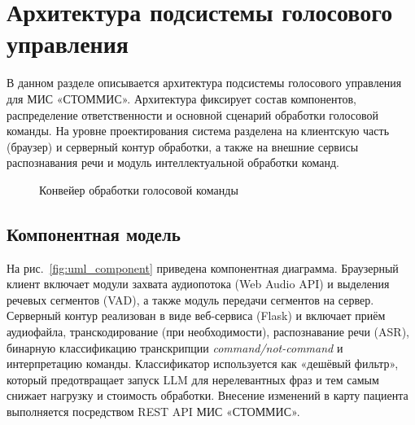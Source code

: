 
\clearpage
\section{Архитектура подсистемы голосового управления}
\label{sec:architecture}

В данном разделе описывается архитектура подсистемы голосового управления для МИС «СТОММИС».
Архитектура фиксирует состав компонентов, распределение ответственности и основной сценарий обработки голосовой команды.
На уровне проектирования система разделена на клиентскую часть (браузер) и серверный контур обработки, а также на внешние сервисы распознавания речи и модуль интеллектуальной обработки команд.

\begin{figure}[t]
    \centering
    \caption{Конвейер обработки голосовой команды}
    \label{fig:pipeline}
\end{figure}

\subsection{Компонентная модель}

На рис.~\ref{fig:uml_component} приведена компонентная диаграмма.
Браузерный клиент включает модули захвата аудиопотока (Web Audio API) и выделения речевых сегментов (VAD), а также модуль передачи сегментов на сервер.
Серверный контур реализован в виде веб-сервиса (Flask) и включает приём аудиофайла, транскодирование (при необходимости), распознавание речи (ASR), бинарную классификацию транскрипции \textit{command/not-command} и интерпретацию команды.
Классификатор используется как «дешёвый фильтр», который предотвращает запуск LLM для нерелевантных фраз и тем самым снижает нагрузку и стоимость обработки.
Внесение изменений в карту пациента выполняется посредством REST API МИС «СТОММИС».

